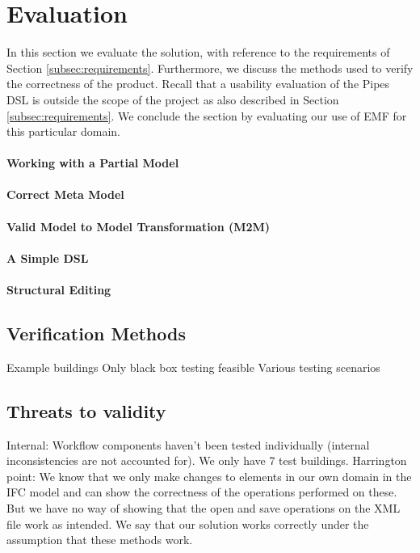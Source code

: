 \section{Evaluation}
In this section we evaluate the solution, with reference to the requirements of Section \ref{subsec:requirements}. Furthermore, we discuss the methods used to verify the correctness of the product. Recall that a usability evaluation of the Pipes DSL is outside the scope of the project as also described in Section \ref{subsec:requirements}. We conclude the section by evaluating our use of EMF for this particular domain.



\paragraph{Working with a Partial Model}
\paragraph{Correct Meta Model}
\paragraph{Valid Model to Model Transformation (M2M)}
\paragraph{A Simple DSL}
\paragraph{Structural Editing}


\subsection{Verification Methods}


Example buildings
Only black box testing feasible
Various testing scenarios


\subsection{Threats to validity}
Internal:
Workflow components haven't been tested individually (internal inconsistencies are not accounted for). We only have 7 test buildings.
Harrington point: We know that we only make changes to elements in our own domain in the IFC model and can show the correctness of the operations performed on these. But we have no way of showing that the open and save operations on the XML file work as intended. We say that our solution works correctly under the assumption that these methods work.

